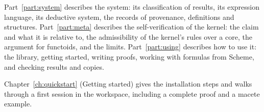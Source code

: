 Part~\ref{part:system} describes the system: its classification of results, its expression language, its deductive system, the records of provenance, definitions and structures.  Part~\ref{part:meta} describes the self-verification of the kernel: the claim and what it is relative to, the admissibility of the kernel's rules over a core, the argument for functoids, and the limits.  Part~\ref{part:using} describes how to use it: the library, getting started, writing proofs, working with formulas from Scheme, and checking results and copies.

Chapter~\ref{ch:quickstart} (Getting started) gives the installation steps and walks through a first session in the workspace, including a complete proof and a macete example.
